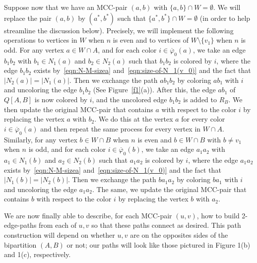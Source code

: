 \documentclass[11pt, oneside]{article}
\newcommand{\pbar}{\overline{\varphi}}
\begin{document}
Suppose now that we have an MCC-pair $(a,b)$ with $\{a,b\}\cap W = \emptyset$. We will replace the pair $(a,b)$ by $(a^*,b^*)$ such that $\{a^*,b^*\}\cap W=\emptyset$ (in order to help streamline the discussion below).  Precisely, we will implement the following 
 operations to vertices in $W$ when $n$ is even and to vertices of $W\setminus \{v_1\} $ when $n$ is odd. 
 For any vertex $a\in W\cap A$, and for each color $i\in \pbar_0(a)$, we take an edge $b_1b_2$ with $b_1\in N_1(a)$ and $b_2\in N_2(a)$ such that $b_1b_2$ is colored by $i$, where the edge $b_1b_2$ exists by~\eqref{eqn:N-M-sizea} and~\eqref{eqn:size-of-N_1(v_0)} and the fact that $|N_2(a)|=|N_1(a)|$.   Then we exchange the path $ab_1b_2$ by coloring $ab_1$
 with $i$ and uncoloring the edge $b_1b_2$ (See Figure~\ref{f1}(a)).
  After this, the edge $ab_1$  of $Q[A,B]$ is now colored by $i$, and the uncolored edge $b_1b_2$ is added to $R_B$.
 We then update the original MCC-pair that contains $a$ with respect to the color $i$ by replacing the vertex $a$ with $b_2$. 
 We do this at the vertex $a$ for every color $i\in \pbar_0(a)$ and then repeat the same process for every vertex in $W\cap A$. 
 Similarly, 
 for any vertex $b\in W\cap B$ when $n$ is even and $b\in W\cap B$ with $b\ne v_1$ when $n$ is odd, and for each color $i\in \pbar_0(b)$, we take an edge $a_1a_2$ with $a_1\in N_1(b)$ and $a_2\in N_2(b)$ such that $a_1a_2$ is colored by $i$, where the edge $a_1a_2$ exists by~\eqref{eqn:N-M-sizea} and~\eqref{eqn:size-of-N_1(v_0)}  and the fact that $|N_1(b)|=|N_2(b)|$.   Then we exchange the path $ba_1a_2$ by coloring $ba_1$
 with $i$ and uncoloring the edge $a_1a_2$. The same, we update the original MCC-pair that contains $b$ with respect to the color $i$ by replacing the vertex $b$ with $a_2$. 

We are now finally able to describe, for each MCC-pair $(u, v)$, how to build 2-edge-paths from each of $u, v$ so that these paths connect as desired. This path construction will depend on whether $u,v$ are on the opposites sides of the bipartition $(A, B)$ or not; our paths will look like those pictured in Figure 1(b) and 1(c), respectively.
\end{document}
